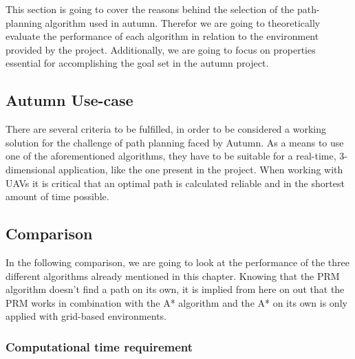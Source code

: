 This section is going to cover the reasons behind the selection of the path-planning algorithm used in autumn. Therefor we are going to theoretically evaluate the performance of each algorithm in relation to the environment provided by the project. Additionally, we are going to focus on properties essential for accomplishing the goal set in the autumn project.

\subsection{Autumn Use-case}

There are several criteria to be fulfilled, in order to be considered a working solution for the challenge of path planning faced by Autumn.
As a means to use one of the aforementioned algorithms, they have to be suitable for a real-time, 3-dimensional application, like the one present in the project.
When working with UAVs it is critical that an optimal path is calculated reliable and in the shortest amount of time possible. 

\subsection{Comparison}

In the following comparison, we are going to look at the performance of the three different algorithms already mentioned in this chapter. Knowing that the PRM algorithm doesn't find a path on its own, it is implied from here on out that the PRM works in combination with the A* algorithm and the A* on its own is only applied with grid-based environments.  

\subsubsection{Computational time requirement}

